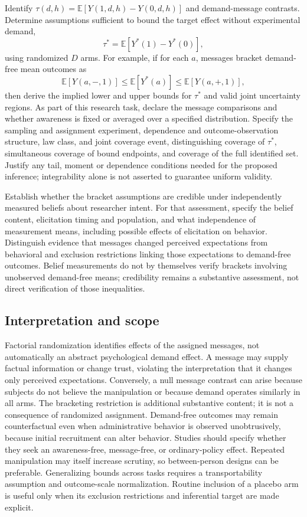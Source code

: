 \documentclass[11pt,a4paper]{article}
\begin{document}
Identify $\tau(d,h)=\mathbb E[Y(1,d,h)-Y(0,d,h)]$ and demand-message contrasts. Determine assumptions sufficient to bound the target effect without experimental demand,
\[
\tau^*=\mathbb E[Y^*(1)-Y^*(0)],
\]
using randomized $D$ arms. For example, if for each $a$, messages bracket demand-free mean outcomes as
\[
\mathbb E[Y(a,-,1)]\leq\mathbb E[Y^*(a)]\leq\mathbb E[Y(a,+,1)],
\]
then derive the implied lower and upper bounds for $\tau^*$ and valid joint uncertainty regions. As part of this research task, declare the message comparisons and whether awareness is fixed or averaged over a specified distribution. Specify the sampling and assignment experiment, dependence and outcome-observation structure, law class, and joint coverage event, distinguishing coverage of $\tau^*$, simultaneous coverage of bound endpoints, and coverage of the full identified set. Justify any tail, moment or dependence conditions needed for the proposed inference; integrability alone is not asserted to guarantee uniform validity.

Establish whether the bracket assumptions are credible under independently measured beliefs about researcher intent. For that assessment, specify the belief content, elicitation timing and population, and what independence of measurement means, including possible effects of elicitation on behavior. Distinguish evidence that messages changed perceived expectations from behavioral and exclusion restrictions linking those expectations to demand-free outcomes. Belief measurements do not by themselves verify brackets involving unobserved demand-free means; credibility remains a substantive assessment, not direct verification of those inequalities.

\subsection*{Interpretation and scope}

Factorial randomization identifies effects of the assigned messages, not automatically an abstract psychological demand effect. A message may supply factual information or change trust, violating the interpretation that it changes only perceived expectations. Conversely, a null message contrast can arise because subjects do not believe the manipulation or because demand operates similarly in all arms. The bracketing restriction is additional substantive content; it is not a consequence of randomized assignment. Demand-free outcomes may remain counterfactual even when administrative behavior is observed unobtrusively, because initial recruitment can alter behavior. Studies should specify whether they seek an awareness-free, message-free, or ordinary-policy effect. Repeated manipulation may itself increase scrutiny, so between-person designs can be preferable. Generalizing bounds across tasks requires a transportability assumption and outcome-scale normalization. Routine inclusion of a placebo arm is useful only when its exclusion restrictions and inferential target are made explicit.
\end{document}
